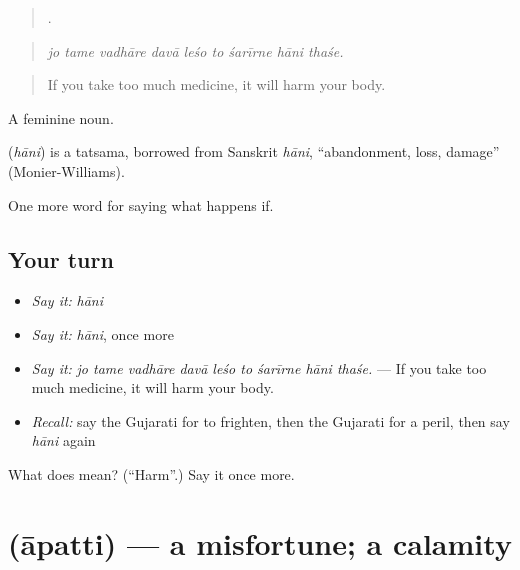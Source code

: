 \begin{quote}
        .
\end{quote}

\begin{quote}
\emph{jo tame vadhāre davā leśo to śarīrne hāni thaśe.}
\end{quote}

\begin{quote}
If you take too much medicine, it will harm your body.
\end{quote}

A feminine noun.

\begin{cousinweb}
\textbf{} (\emph{hāni}) is a tatsama, borrowed from Sanskrit \emph{hāni}, \textquotedblleft{}abandonment, loss, damage\textquotedblright{} (Monier-Williams).
\end{cousinweb}

\begin{grammarlens}[title={What you've built}]
One more word for saying what happens if.
\end{grammarlens}

\subsection*{Your turn}
\begin{itemize}
\raggedright
  \item \emph{Say it:} \emph{hāni}
  \item \emph{Say it:} \emph{hāni}, once more
  \item \emph{Say it:} \emph{jo tame vadhāre davā leśo to śarīrne hāni thaśe.} — If you take too much medicine, it will harm your body.
  \item \emph{Recall:} say the Gujarati for to frighten, then the Gujarati for a peril, then say \emph{hāni} again
\end{itemize}

\begin{tcolorbox}[breakable,colback=teal!4,colframe=teal!35!black,title={Before you move on}]
What does  mean? (\textquotedblleft{}Harm\textquotedblright{}.) Say it once more.
\end{tcolorbox}
\section[\texorpdfstring{\gu{આપત્તિ} (āpatti)}{આપત્તિ (āpatti)}]{ (āpatti) — a misfortune; a calamity}

